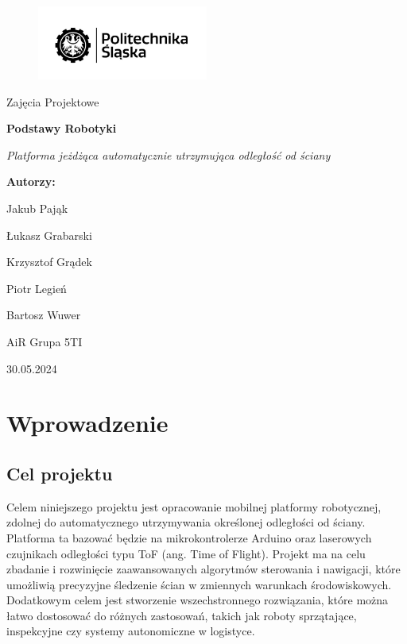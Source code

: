 \documentclass{report}
\begin{document}
\begin{titlepage}
    \centering
    \vspace*{1cm}
    \begin{figure}
        \centering 
        \includegraphics[width=0.5\textwidth]{"src/logo.png"}
    \end{figure}
    \Huge
    Zajęcia Projektowe
    \par
    \textbf{Podstawy Robotyki}
    
    \vspace*{1cm}

    \vspace{0.5cm}
    \LARGE \textit{Platforma jeżdżąca automatycznie utrzymująca odległość od ściany}
    
    \vspace{1.5cm}
    
    \textbf{Autorzy:} 
    \par
    Jakub Pająk 
    \par
    Łukasz Grabarski
    \par 
    Krzysztof Grądek
    \par 
    Piotr Legień
    \par
    Bartosz Wuwer
    \vspace*{1.5cm}
    \par AiR Grupa 5TI
    
    \vfill
    
    \Large 30.05.2024
    
\end{titlepage}


\newpage

\tableofcontents

\newpage


\section{\LARGE Wprowadzenie}
\subsection{\Large Cel projektu}
Celem niniejszego projektu jest opracowanie mobilnej platformy robotycznej, zdolnej do automatycznego utrzymywania określonej odległości od ściany. Platforma ta bazować będzie na mikrokontrolerze Arduino oraz laserowych czujnikach odległości typu ToF (ang. Time of Flight). Projekt ma na celu zbadanie i rozwinięcie zaawansowanych algorytmów sterowania i nawigacji, które umożliwią precyzyjne śledzenie ścian w zmiennych warunkach środowiskowych. Dodatkowym celem jest stworzenie wszechstronnego rozwiązania, które można łatwo dostosować do różnych zastosowań, takich jak roboty sprzątające, inspekcyjne czy systemy autonomiczne w logistyce.
\end{document}
